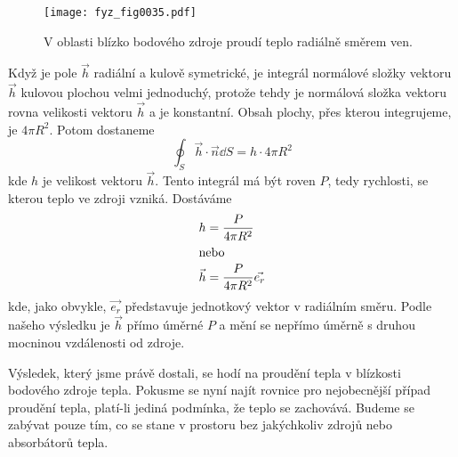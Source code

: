         \begin{figure}[ht!]  %
          \centering
          \texttt{[image: fyz\_fig0035.pdf]}
          \caption{V oblasti blízko bodového zdroje proudí teplo radiálně směrem ven.}
          \label{fyz:fig0035}
        \end{figure}      
        Když je pole \(\vec{h}\) radiální a kulově symetrické, je integrál normálové složky vektoru
        \(\vec{h}\) kulovou plochou velmi jednoduchý, protože tehdy je normálová složka vektoru
        rovna velikosti vektoru \(\vec{h}\) a je konstantní. Obsah plochy, přes kterou integrujeme,
        je \(4\pi R^2\). Potom dostaneme 
        \begin{equation}\label{fyz:eq_gauss6}
          \oint_S\vec{h}\cdot\vec{n}\dd{S} = h\cdot4\pi R^2
        \end{equation}
        kde \(h\) je velikost vektoru \(\vec{h}\). Tento integrál má být roven \(P\), tedy rychlosti, 
        se kterou teplo ve zdroji vzniká. Dostáváme
        \begin{align}
          h       &= \frac{P}{4\pi R^2}                \nonumber                  \\
          \shortintertext{nebo}
          \vec{h} &= \frac{P}{4\pi R^2}\vec{e_r}       \label{fyz:eq_gauss7}
        \end{align} 
        kde, jako obvykle, \(\vec{e_r}\) představuje jednotkový vektor v radiálním směru. Podle 
        našeho výsledku je \(\vec{h}\) přímo úměrné \(P\) a mění se nepřímo úměrně s druhou mocninou 
        vzdálenosti od zdroje.
        
        Výsledek, který jsme právě dostali, se hodí na proudění tepla v blízkosti bodového zdroje
        tepla. Pokusme se nyní najít rovnice pro nejobecnější případ proudění tepla, platí-li jediná
        podmínka, že teplo se zachovává. Budeme se zabývat pouze tím, co se stane v prostoru bez
        jakýchkoliv zdrojů nebo absorbátorů tepla.
        
